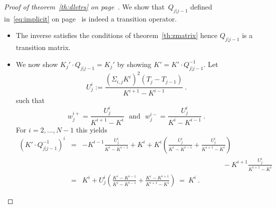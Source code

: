\documentclass[twoside]{article}
\theoremstyle{plain}
\theoremstyle{definition}
\theoremstyle{remark}
\begin{document}
\begin{proof}[Proof of theorem~\ref{th:dlvtrs} on page~\pageref{th:dlvtrs}]
We show that~$Q_{j|j-1}$ defined in~\eqref{eq:implicit} on page~\pageref{eq:implicit}
is indeed a transition operator.
\begin{itemize}
    \item The inverse satisfies the conditions of theorem~\eqref{th:zmatrix} hence
    $Q_{j|j-1}$ is a transition matrix.
    \item We now show $K_j'\cdot Q_{j|j-1}=K_j'$ by showing
    $K'=K'\cdot Q_{j|j-1}^{-1}$. Let
    $$
        U^i_j := \frac{ (\Sigma_{i,j} K^i)^2 (T_j-T_{j-1})}{ K^{i+1} - K^{i-1} } \ .
    $$
    such that
    $$
        w^{i+}_j = \frac{ U^i_j }{ K^{i+1} - K^i } 
        \ \ \ \mbox{and} \ \ \
        w^{i-}_j = \frac{ U^i_j }{ K^i - K^{i-1} }  \ .
    $$
    For $i=2,\ldots,N-1$ this yields
    \begin{eqnarray*}
        (K'\cdot Q_{j|j-1}^{-1})^i
        & = &
        -
        K^{i-1} \frac{ U^i_j }{ K^i - K^{i-1} }  
        +
        K^i + K^i \left( \frac{ U^i_j }{ K^i - K^{i-1} }   + \frac{ U^i_j }{ K^{i+1} - K^i } \right)
        \\
        &  &\qquad \qquad\qquad\qquad\qquad\qquad\qquad\qquad\qquad\qquad - K^{i+1} \frac{ U^i_j }{ K^{i+1} - K^i }  \\
        & = &
        K^i + 
         U^i_j \left(
         \frac{  K^i  - K^{i-1}}{ K^i - K^{i-1} }  +    
         \frac{ K^i- K^{i+1} }{ K^{i+1}{} - K^i }          
        \right)\ = \  K^i \ .
    \end{eqnarray*}
\end{itemize}
\end{proof}
\end{document}
